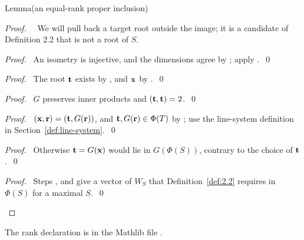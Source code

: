 \begin{namedresult}{Lemma}{(an equal-rank proper inclusion)}\label{lem:sec3-proper-inclusion}
\end{namedresult}
\begin{proof}
 \pfsketch\ \new\ We will pull back a target root outside the image; it is a candidate
 of Definition 2.2 that is not a root of $S$.
 \begin{proof}\pf\ An isometry is injective, and the dimensions agree by ;
  apply .~\qed\end{proof}
 \begin{proof}\pf\ The root ${\mathbf t}$ exists by , and ${\mathbf x}$ by
  .~\qed\end{proof}
 \begin{proof}\pf\ $G$ preserves inner products and $({\mathbf t},{\mathbf t})=2$.~\qed\end{proof}
 \begin{proof}\pf\ $({\mathbf x},{\mathbf r})=({\mathbf t},G({\mathbf r}))$, and ${\mathbf t},G({\mathbf r})\in\Phi(T)$ by
  ; use the line-system definition in Section~\ref{def:line-system}.~\qed\end{proof}
 \begin{proof}\pf\ Otherwise ${\mathbf t}=G({\mathbf x})$ would lie in $G(\Phi(S))$, contrary to the
  choice of ${\mathbf t}$.~\qed\end{proof}
 \qedstep
 \begin{proof}\pf\ Steps ,  and
   give a vector of $W_S$ that Definition~\ref{def:2.2} requires in
  $\Phi(S)$ for a maximal $S$.~\qed\end{proof}
\end{proof}
The rank declaration is in the Mathlib file .

